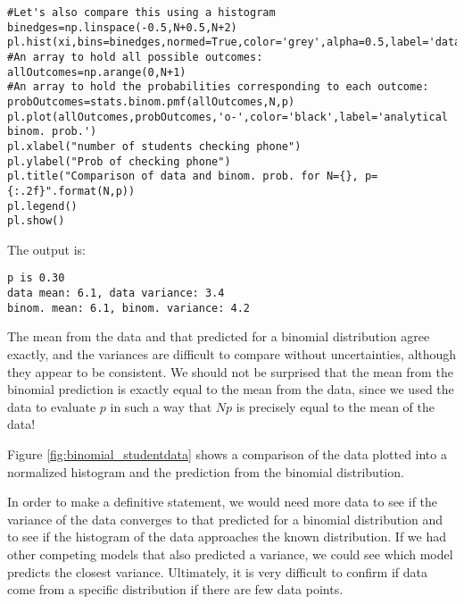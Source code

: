 \begin{example}{}
\begin{lstlisting}[frame=single]
#Let's also compare this using a histogram
binedges=np.linspace(-0.5,N+0.5,N+2)
pl.hist(xi,bins=binedges,normed=True,color='grey',alpha=0.5,label='data')
#An array to hold all possible outcomes:
allOutcomes=np.arange(0,N+1)
#An array to hold the probabilities corresponding to each outcome:
probOutcomes=stats.binom.pmf(allOutcomes,N,p)
pl.plot(allOutcomes,probOutcomes,'o-',color='black',label='analytical binom. prob.')
pl.xlabel("number of students checking phone")
pl.ylabel("Prob of checking phone")
pl.title("Comparison of data and binom. prob. for N={}, p={:.2f}".format(N,p))
pl.legend()
pl.show()
\end{lstlisting}
The output is:
\begin{verbatim}
p is 0.30
data mean: 6.1, data variance: 3.4
binom. mean: 6.1, binom. variance: 4.2
\end{verbatim}
The mean from the data and that predicted for a binomial distribution agree exactly, and the variances are difficult to compare without uncertainties, although they appear to be consistent. We should not be surprised that the mean from the binomial prediction is exactly equal to the mean from the data, since we used the data to evaluate $p$ in such a way that $Np$ is precisely equal to the mean of the data!

Figure \ref{fig:binomial_studentdata} shows a comparison of the data plotted into a normalized histogram and the prediction from the binomial distribution.


In order to make a definitive statement, we would need more data to see if the variance of the data converges to that predicted for a binomial distribution and to see if the histogram of the data approaches the known distribution. If we had other competing models that also predicted a variance, we could see which model predicts the closest variance. Ultimately, it is very difficult to confirm if data come from a specific distribution if there are few data points.
\end{example}

